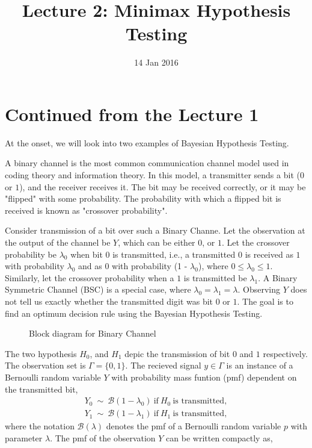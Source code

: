 \documentclass[a4paper,english,12pt]{article}
\title{Lecture 2: Minimax Hypothesis Testing}
\date{14 Jan 2016}
\begin{document}
\maketitle
\section{Continued from the Lecture 1}
At the onset, we will look into two examples of Bayesian Hypothesis Testing.
\begin{exmp} 
A binary channel is the most common communication channel model used in coding theory and information theory. In this model, a transmitter sends a bit ($0$ or $1$), and the receiver receives it. The bit may be received correctly, or it may be "flipped" with some probability. The probability with which a flipped bit is received is known as "crossover probability". 
\par Consider transmission of a bit over such a Binary Channe. Let the observation at the output of the channel be $Y$, which can be either $0$, or $1$. Let the crossover probability be $\lambda_0$ when bit $0$ is transmitted, i.e., a transmitted $0$ is received as $1$ with probability $\lambda_0$ and as $0$ with probability (1 - $\lambda_0$), where $0 \leq \lambda_0 \leq 1$. Similarly, let the crossover probability when a $1$ is transmitted  be $\lambda_1$. A Binary Symmetric Channel (BSC) is a special case, where $\lambda_0=\lambda_1=\lambda$. Observing $Y$ does not tell us exactly whether the transmitted digit was bit $0$ or $1$. The goal is to find an optimum decision rule using the Bayesian Hypothesis Testing.
\begin{figure}[h]
\centering

\caption{Block diagram for Binary Channel}
\label{fig:bsc1}
\end{figure}
\par The two hypothesis $H_0$, and $H_1$ depic the transmission of bit $0$ and $1$ respectively. The observation set is $\Gamma=\{0,1\}$. The recieved signal $y \in \Gamma$ is an instance of a Bernoulli random variable $Y$ with probability mass funtion (pmf) dependent on the transmitted bit,
\begin{eqnarray}
Y_{0}~\sim~\mathcal{B}\left( 1-\lambda_{0}\right) ~\mbox{if}~H_0~\mbox{is transmitted},\\\nonumber
Y_{1}~\sim~\mathcal{B}\left( 1-\lambda_{1}\right)~\mbox{if}~H_1~\mbox{is transmitted},
\end{eqnarray}
where the notation $\mathcal{B}(\lambda)$ denotes the pmf of a Bernoulli random variable $p$ with parameter $\lambda$. The pmf of the observation $Y$ can be written compactly as,

\end{exmp}
\end{document}
